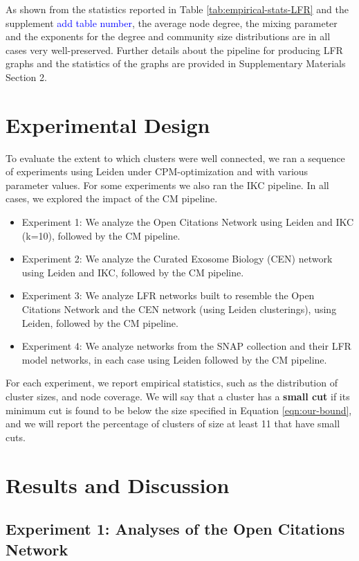 \documentclass[11pt]{article}   	%
\begin{document}
As shown from the statistics reported in Table \ref{tab:empirical-stats-LFR} and the supplement \textcolor{blue}{add table number}, the average node degree, the mixing parameter and the exponents for the degree and community size distributions are in all cases very well-preserved. Further details about the pipeline for producing LFR graphs and the statistics of the graphs are provided in Supplementary Materials Section 2.

\section{Experimental Design}
\label{sec:expt-design}
To evaluate the extent to which clusters were well connected, we ran a sequence of experiments using Leiden under CPM-optimization and with various parameter values. For some experiments we also ran the IKC pipeline.  In all cases, we explored the impact of the CM pipeline.
\begin{itemize}
\item Experiment 1: We analyze the Open Citations Network using Leiden  and IKC (k=10), followed by the CM pipeline.
\item Experiment 2: We analyze the Curated Exosome Biology (CEN) network using Leiden and IKC, followed by the CM pipeline.
\item Experiment 3: We analyze LFR networks built to resemble the Open Citations Network and the CEN network (using Leiden clusterings), using Leiden, followed by the CM pipeline.
\item Experiment 4: We analyze networks from the SNAP collection and their LFR model networks, in each case using Leiden followed by the CM pipeline.
\end{itemize}

For each experiment, we report empirical statistics, such as the distribution of cluster sizes, and node  coverage.
We will say that a cluster has a {\bf small cut} if its minimum cut is found to be below  the size specified in
 Equation \ref{eqn:our-bound}, and we will report the percentage of clusters of size at least 11 that have small cuts.


\section{Results and Discussion}
\label{sec:results-discussion}

\subsection{Experiment 1: Analyses of the Open Citations Network}
\end{document}
